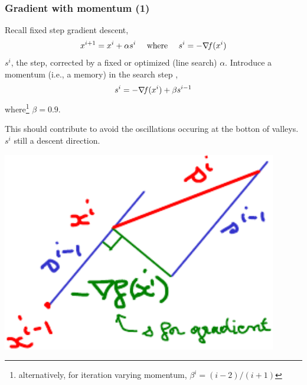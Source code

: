 \documentclass[12pt]{beamer}
\begin{document}
\begin{frame}
\frametitle{Gradient with momentum (1)} 
Recall fixed step gradient descent, 
\begin{equation*} 
x^{i+1} = x^i + \alpha s^i  \quad\text{ where }\quad s^i= -\nabla\!{f}(x^i) 
\end{equation*} 
$s^i$, the step, corrected by a fixed or optimized (line search) $\alpha$.
Introduce a momentum (i.e., a memory) in the search step \cite{polyak1964some},
\begin{equation*} 
s^i = -\nabla\!{f}(x^i) + \beta s^{i-1}
\end{equation*} 
where\footnote{alternatively, for iteration varying momentum, $\beta^i=(i-2)/(i+1)$} $\beta = 0.9$.\\
\vspace{-0.8cm}
\begin{minipage}[c]{0.5\textwidth}
This should contribute to avoid the oscillations occuring at the botton of valleys.\\
$s^i$ still a descent direction.
\end{minipage}
\begin{minipage}[c]{0.4\textwidth}
\begin{center}
\includegraphics[width=0.9\textwidth]{momentum-crop.pdf} 
\end{center}
\end{minipage}
\end{frame}
\end{document}
